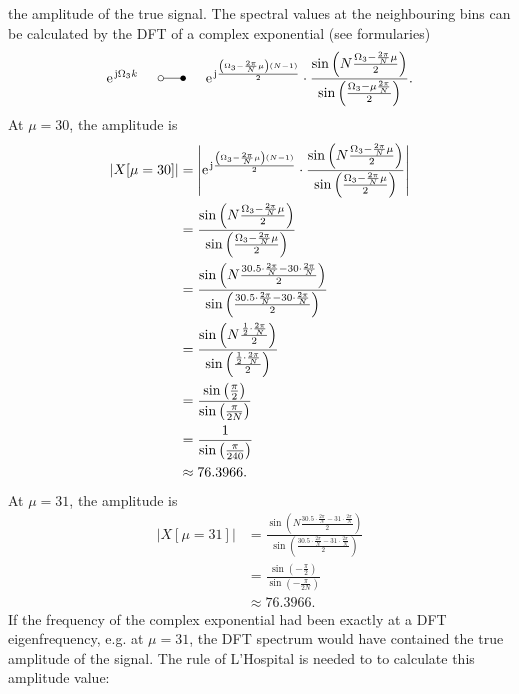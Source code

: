 \documentclass[11pt,a4paper,DIV=12]{scrartcl}
\begin{document}
\begin{Loesung}
\begin{enumerate}[label=\alph*)]
	the amplitude of the true signal.
%
	The spectral values at the neighbouring bins can be calculated by the DFT of
	a complex exponential (see formularies)
%
	\begin{equation}
	\e^{\im\Omega_3 k} \hspace{5mm}\laplace\hspace{5mm} \e^{\im\frac{\left(\Omega_3-\frac{2\pi}{N}\mu\right)(N-1)}{2}}\cdot\frac{\sin\left(N\frac{\Omega_3-\frac{2\pi}{N}\mu}{2}\right)}{\sin\left(\frac{\Omega_3-\mu\frac{2\pi}{N}}{2}\right)}.\nonumber
	\end{equation}
%
	At $\mu=30$, the amplitude is
%
	\begin{align}
	|X[\mu=30]|&=\left|\e^{\im\frac{\left(\Omega_3-\frac{2\pi}{N}\mu\right)(N-1)}{2}}\cdot\frac{\sin\left(N\frac{\Omega_3-\frac{2\pi}{N}\mu}{2}\right)}{\sin\left(\frac{\Omega_3-\frac{2\pi}{N}\mu}{2}\right)}\right|\nonumber\\
	&=\frac{\sin\left(N\frac{\Omega_3-\frac{2\pi}{N}\mu}{2}\right)}{\sin\left(\frac{\Omega_3-\frac{2\pi}{N}\mu}{2}\right)}\nonumber\\
	&=\frac{\sin\left(N\frac{30.5\cdot\frac{2\pi}{N}-30\cdot\frac{2\pi}{N}}{2}\right)}{\sin\left(\frac{30.5\cdot\frac{2\pi}{N}-30\cdot\frac{2\pi}{N}}{2}\right)}\nonumber\\
	&=\frac{\sin\left(N\frac{\frac{1}{2}\cdot\frac{2\pi}{N}}{2}\right)}{\sin\left(\frac{\frac{1}{2}\cdot\frac{2\pi}{N}}{2}\right)}\nonumber\\
	&=\frac{\sin\left(\frac{\pi}{2}\right)}{\sin\left(\frac{\pi}{2N}\right)}\nonumber\\
	&=\frac{1}{\sin\left(\frac{\pi}{240}\right)}\nonumber\\
	&\approx76.3966.\nonumber
	\end{align}
%
	At $\mu=31$, the amplitude is
%
	\begin{align}
	|X[\mu=31]|&=\frac{\sin\left(N\frac{30.5\cdot\frac{2\pi}{N}-31\cdot\frac{2\pi}{N}}{2}\right)}{\sin\left(\frac{30.5\cdot\frac{2\pi}{N}-31\cdot\frac{2\pi}{N}}{2}\right)}\nonumber\\
	&=\frac{\sin\left(-\frac{\pi}{2}\right)}{\sin\left(-\frac{\pi}{2N}\right)}\nonumber\\
	&\approx76.3966.\nonumber
	\end{align}
%
	If the frequency of the complex exponential had been exactly at a DFT
	eigenfrequency, e.g. at $\mu=31$, the DFT spectrum would have contained the
	true amplitude of the signal.
	The rule of L'Hospital is needed to to calculate this amplitude value:
%
	\begin{align}

\end{align}
\end{enumerate}
\end{Loesung}
\end{document}
